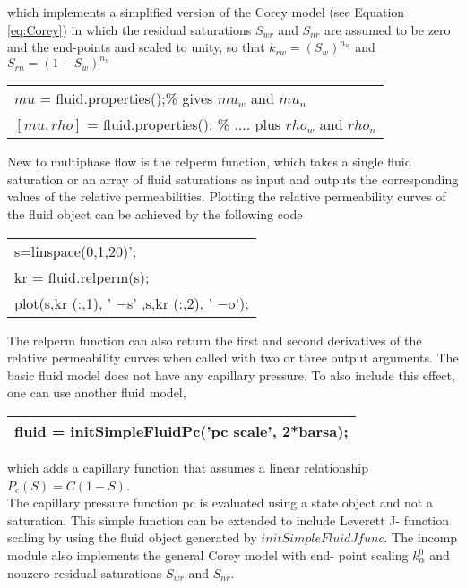 \documentclass[a4paper,10pt]{report}
\begin{document}
which implements a simplified version of the Corey model (see Equation \ref{eq:Corey}) in which the residual saturations $S_{wr}$ and $S_{nr}$ are assumed to be zero and the end-points
and  scaled to unity, so that $k_{rw} = (S_w)^{n_w}$ and $S_{rn} = (1 − S_w)^{n_n}$

\begin{table}[!ht]
\centering
\begin{tabular}{ |l |} 
\hline
$mu$ = fluid.properties();\% gives $mu_w$ and $mu_n$ \\
$[mu,rho]$ = fluid.properties(); \% .... plus $rho_w$ and $rho_n$\\
 \hline
\end{tabular}
\label{table:fluidp}
\end{table}  
New to multiphase flow is the relperm function, which takes a single fluid saturation or an array of fluid saturations as input and outputs the corresponding
values of the relative permeabilities. Plotting the relative permeability curves
of the fluid object can be achieved by the following code
\begin{table}[!ht]
\centering
\begin{tabular}{ |l |} 
\hline
s=linspace(0,1,20)';\\
kr = fluid.relperm(s);\\
plot(s,kr (:,1), ' −s' ,s,kr (:,2), ' −o');\\
 \hline
\end{tabular}
\label{table:fluid}
\end{table} 

The relperm function can also return the first and second derivatives of the
relative permeability curves when called with two or three output arguments.
The basic fluid model does not have any capillary pressure. To also include
this effect, one can use another fluid model,
\begin{table}[!ht]
\centering
\begin{tabular}{ |l |} 
\hline
fluid = initSimpleFluidPc('pc scale', 2*barsa);\\
 \hline
\end{tabular}
\label{table:fluid}
\end{table} 
which adds a capillary function that assumes a linear relationship $P_c (S) =
C(1 − S)$. \\
The capillary pressure function pc is evaluated using a state object and not
a saturation. This simple function can be extended to include Leverett J-
function scaling by using the fluid object generated by
$initSimpleFluidJfunc$.
The incomp module also implements the general Corey model with end-
point scaling $k_{\alpha}^0$ and nonzero residual saturations $S_{wr}$ and $S_{nr}$.\\
\end{document}
